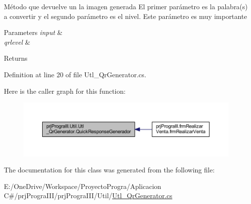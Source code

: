 Método que devuelve un la imagen generada El primer parámetro es la palabra(s) a convertir y el segundo parámetro es el nivel. Este parámetro es muy importante 


\begin{DoxyParams}{Parameters}
{\em input} & \\
\hline
{\em qrlevel} & \\
\hline
\end{DoxyParams}
\begin{DoxyReturn}{Returns}

\end{DoxyReturn}


Definition at line 20 of file Utl\+\_\+\+Qr\+Generator.\+cs.

Here is the caller graph for this function\+:
\nopagebreak
\begin{figure}[H]
\begin{center}
\leavevmode
\includegraphics[width=350pt]{classprj_progra_i_i_i_1_1_util_1_1_utl___qr_generator_aa38b9204027dbb99f61c2fb0edd24fdf_icgraph}
\end{center}
\end{figure}


The documentation for this class was generated from the following file\+:\begin{DoxyCompactItemize}
\item 
E\+:/\+One\+Drive/\+Workspace/\+Proyecto\+Progra/\+Aplicacion C\#/prj\+Progra\+I\+I\+I/prj\+Progra\+I\+I\+I/\+Util/\hyperlink{_utl___qr_generator_8cs}{Utl\+\_\+\+Qr\+Generator.\+cs}\end{DoxyCompactItemize}
